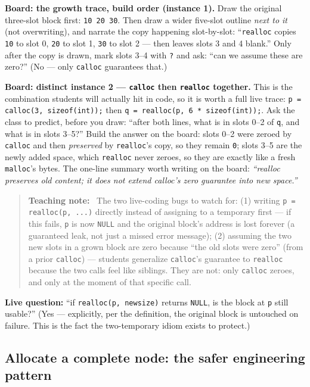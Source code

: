 \documentclass[11pt]{article}
\newenvironment{teachingaside}{\begin{quote}\small\color{primary-gold}\textbf{Teaching note:}\ }{\end{quote}}
\begin{document}
\textbf{Board: the growth trace, build order (instance 1).} Draw the original three-slot block first: \texttt{10 20 30}. Then draw a wider five-slot outline \emph{next to it} (not overwriting), and narrate the copy happening slot-by-slot: ``\texttt{realloc} copies \texttt{10} to slot 0, \texttt{20} to slot 1, \texttt{30} to slot 2 --- then leaves slots 3 and 4 blank.'' Only after the copy is drawn, mark slots 3--4 with \texttt{?} and ask: ``can we assume these are zero?'' (No --- only \texttt{calloc} guarantees that.)

\textbf{Board: distinct instance 2 --- \texttt{calloc} then \texttt{realloc} together.} This is the combination students will actually hit in code, so it is worth a full live trace: \texttt{p = calloc(3, sizeof(int));} then \texttt{q = realloc(p, 6 * sizeof(int));}. Ask the class to predict, before you draw: ``after both lines, what is in slots 0--2 of \texttt{q}, and what is in slots 3--5?'' Build the answer on the board: slots 0--2 were zeroed by \texttt{calloc} and then \emph{preserved} by \texttt{realloc}'s copy, so they remain \texttt{0}; slots 3--5 are the newly added space, which \texttt{realloc} never zeroes, so they are  exactly like a fresh \texttt{malloc}'s bytes. The one-line summary worth writing on the board: \emph{``realloc preserves old content; it does not extend calloc's zero guarantee into new space.''}

\begin{teachingaside}
The two live-coding bugs to watch for: (1) writing \texttt{p = realloc(p, ...)} directly instead of assigning to a temporary first --- if this fails, \texttt{p} is now \texttt{NULL} and the original block's address is lost forever (a guaranteed leak, not just a missed error message); (2) assuming the two new slots in a grown block are zero because ``the old slots were zero'' (from a prior \texttt{calloc}) --- students generalize \texttt{calloc}'s guarantee to \texttt{realloc} because the two calls feel like siblings. They are not: only \texttt{calloc} zeroes, and only at the moment of that specific call.
\end{teachingaside}

\textbf{Live question:} ``if \texttt{realloc(p, newsize)} returns \texttt{NULL}, is the block at \texttt{p} still usable?'' (Yes --- explicitly, per the definition, the original block is untouched on failure. This is the fact the two-temporary idiom exists to protect.)

\subsection{Allocate a complete node: the safer engineering pattern}
\label{sec:node}
\end{document}
